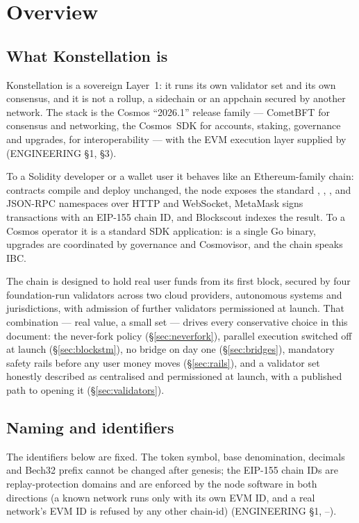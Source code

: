 \section{Overview}
\label{sec:overview}

\subsection{What Konstellation is}

Konstellation is a sovereign Layer~1: it runs its own validator set and its own
consensus, and it is not a rollup, a sidechain or an appchain secured by another
network. The stack is the Cosmos ``2026.1'' release family --- CometBFT for
consensus and networking, the Cosmos~SDK for accounts, staking, governance and
upgrades,  for interoperability --- with the EVM execution layer
supplied by  (ENGINEERING \S1, \S3).

To a Solidity developer or a wallet user it behaves like an Ethereum-family
chain: contracts compile and deploy unchanged, the node exposes the standard
, , ,  and 
JSON-RPC namespaces over HTTP and WebSocket, MetaMask signs transactions with an
EIP-155 chain ID, and Blockscout indexes the result. To a Cosmos operator it is
a standard SDK application:  is a single Go binary, upgrades
are coordinated by governance and Cosmovisor, and the chain speaks IBC.

The chain is designed to hold real user funds from its first block, secured by
four foundation-run validators across two cloud providers, autonomous systems
and jurisdictions, with admission of further validators permissioned at launch. That
combination --- real value, a small set --- drives every
conservative choice in this document: the never-fork policy
(\S\ref{sec:neverfork}), parallel execution switched off at launch
(\S\ref{sec:blockstm}), no bridge on day one (\S\ref{sec:bridges}), mandatory
safety rails before any user money moves (\S\ref{sec:rails}), and a validator
set honestly described as centralised and permissioned at launch, with a
published path to opening it (\S\ref{sec:validators}).

\subsection{Naming and identifiers}

The identifiers below are fixed. The token symbol, base denomination, decimals
and Bech32 prefix cannot be changed after genesis; the EIP-155 chain IDs are
replay-protection domains and are enforced by the node software in both
directions (a known network runs only with its own EVM ID, and a real network's
EVM ID is refused by any other chain-id) (ENGINEERING \S1, --).

